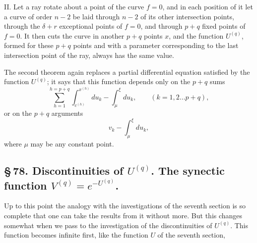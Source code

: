 \documentclass[10pt]{article}
\begin{document}
II. Let a ray rotate about a point of the curve \(f=0\), and in each position of it let a curve of order \(n-2\) be laid through \(n-2\) of its other intersection points, through the \(\delta+r\) exceptional points of \(f=0\), and through \(p+q\) fixed points of \(f=0\). It then cuts the curve in another \(p+q\) points \(x\), and the function \(U^{(q)}\), formed for these \(p+q\) points and with a parameter corresponding to the last intersection point of the ray, always has the same value.

The second theorem again replaces a partial differential equation satisfied by the function \(U^{(q)}\); it says that this function depends only on the \(p+q\) sums
\[
\sum_{h=1}^{h=p+q}\int_{c^{(h)}}^{x^{(h)}}du_k-\int_{\mu}^{\xi}du_k,
\qquad (k=1,2\ldots p+q),
\]
or on the \(p+q\) arguments
\[
v_k-\int_{\mu}^{\xi}du_k,
\]
where \(\mu\) may be any constant point.

\subsection*{\S\,78. Discontinuities of \(U^{(q)}\). The synectic function \(V^{(q)}=e^{-U^{(q)}}\).}

Up to this point the analogy with the investigations of the seventh section is so complete that one can take the results from it without more. But this changes somewhat when we pass to the investigation of the discontinuities of \(U^{(q)}\). This function becomes infinite first, like the function \(U\) of the seventh section,
\end{document}
